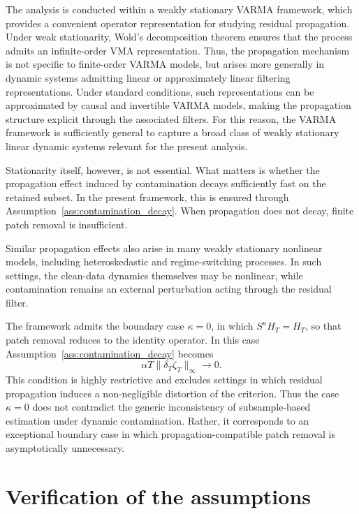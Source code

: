 \documentclass[12pt]{article}
\numberwithin{equation}{section}
\begin{document}
The analysis is conducted within a weakly stationary VARMA framework, which provides a convenient operator representation for studying residual propagation. 
Under weak stationarity, Wold's decomposition theorem \citep{wold1938study} ensures that the process admits an infinite-order VMA representation. 
Thus, the propagation mechanism is not specific to finite-order VARMA models, but arises more generally in dynamic systems admitting linear or approximately linear filtering representations. 
Under standard conditions, such representations can be approximated by causal and invertible VARMA models, making the propagation structure explicit through the associated filters. 
For this reason, the VARMA framework is sufficiently general to capture a broad class of weakly stationary linear dynamic systems relevant for the present analysis.

Stationarity itself, however, is not essential. 
What matters is whether the propagation effect induced by contamination decays sufficiently fast on the retained subset. 
In the present framework, this is ensured through Assumption~\ref{ass:contamination_decay}. 
When propagation does not decay, finite patch removal is insufficient.

Similar propagation effects also arise in many weakly stationary nonlinear models, including heteroskedastic and regime-switching processes. 
In such settings, the clean-data dynamics themselves may be nonlinear, while contamination remains an external perturbation acting through the residual filter.

The framework admits the boundary case $\kappa=0$, in which
$S^\kappa H_T = H_T$,
so that patch removal reduces to the identity operator.
In this case Assumption~\ref{ass:contamination_decay} becomes
\begin{equation}\label{eq:strongcase}
\alpha T\|\delta_T\zeta_T\|_\infty \longrightarrow 0.
\end{equation}
This condition is highly restrictive and excludes settings in which residual propagation induces a non-negligible distortion of the criterion.
Thus the case $\kappa=0$ does not contradict the generic inconsistency of subsample-based estimation under dynamic contamination.
Rather, it corresponds to an exceptional boundary case in which propagation-compatible patch removal is asymptotically unnecessary.


\section{Verification of the assumptions}\label{sec:verification}
\end{document}
